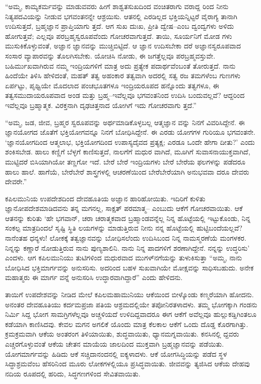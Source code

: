 “ಅಮ್ಮ, ಕಾಮ್ಯಕರ್ಮವನ್ನು ಮಾಡುವವರು ಹೀಗೆ ಶಾಶ್ವತಸುಖದಿಂದ ವಂಚಿತರಾಗು ವರಾದ್ದ ರಿಂದ ನೀನು ನಿತ್ಯಪದವಿಯನ್ನು ನೀಡುವ ಭಗವಂತನನ್ನೇ ಆಶ್ರಯಿಸು. ಆತನಲ್ಲಿ ಎರಡಿಲ್ಲದ ಭಕ್ತಿಯನ್ನಿಟ್ಟರೆ ವೈರಾಗ್ಯ ತಾನಾಗಿ ಉದಿಸುತ್ತದೆ, ಬ್ರಹ್ಮಜ್ಞಾನ ಪ್ರಾಪ್ತಿಯಾಗು ತ್ತದೆ. ಆಗ ಸುಖ ದುಃಖ, ಪ್ರೀತಿ ದ್ವೇಷ–ಎಂಬ ದ್ವಂದ್ವಗಳು ಅಳಿದು ಹೋಗುತ್ತವೆ; ಎಲ್ಲವೂ ಪರಬ್ರಹ್ಮಸ್ವರೂಪವೆಂದು ಗೋಚರವಾಗುತ್ತದೆ. ತಾಯಿ, ಸೂರ್ಯನಿಗೆ ಮೋಡ ಗಳು ಮುಸುಕಿಕೊಳ್ಳುವಂತೆ, ಅಜ್ಞಾನ ಜ್ಞಾನವನ್ನು ಮುಚ್ಚಿಬಿಟ್ಟಿದೆ. ಆ ಜ್ಞಾನ ಉದಿಸಬೇಕಾ ದರೆ ಅಜ್ಞಾನಸ್ವರೂಪವಾದ ಸಂಸಾರ ವ್ಯಾಪಾರವನ್ನು ತೊಲಗಿಸಬೇಕು. ಯೋಚಿಸಿ ನೋಡು, ಈ ಜಗತ್ತೆಲ್ಲವೂ ಪರಬ್ರಹ್ಮವಸ್ತುವೇ. ಬಹಿರ್ಮುಖವಾಗಿರುವ ನಮ್ಮ ಇಂದ್ರಿಯಗಳಿಗೆ ಮಾತ್ರ ಅದು ಪ್ರತ್ಯೇಕ ಪದಾರ್ಥವೆಂಬಂತೆ ತೋರುತ್ತದೆ. ನಾನು ಹಿಂದೆಯೇ ತಿಳಿಸಿ ಹೇಳಿದಂತೆ, ಮಹತ್ ತತ್ವ ಅಹಂಕಾರ ತತ್ವವಾಗಿ ಅದರಲ್ಲಿ ಸತ್ವ ರಜ ತಮಗಳೆಂಬ ಗುಣಗಳು ಏರ್ಪಟ್ಟು, ಪೃಥ್ವಿಯೇ ಮೊದಲಾದ ಪಂಚಭೂತಗಳೂ ಇಂದ್ರಿಯರೂಪದ ಹನ್ನೊಂದು ತತ್ವಗಳೂ, ಈ ತತ್ವಸಮುದಾಯರೂಪವಾದ ಅಂಡ ಮತ್ತು ಬ್ರಹ್ಮ–ಇವೆಲ್ಲವೂ ಭಗವಂತನಿಂದ ಉದಿಸಿ ಬಂದುವಲ್ಲವೆ? ಆದ್ದರಿಂದ ಇವೆಲ್ಲವೂ ಬ್ರಹ್ಮಾತ್ಮಕ. ವಿರಕ್ತನಾಗಿ ದೃಢಚಿತ್ತನಾದ ಯೋಗಿಗೆ ಇದು ಗೋಚರವಾಗು ತ್ತದೆ.”

“ಅಮ್ಮ, ಜಡ, ಜೀವ, ಬ್ರಹ್ಮರ ಸ್ವರೂಪವನ್ನು ಅರ್ಥಮಾಡಿಕೊಳ್ಳಬಲ್ಲ ಆತ್ಮಜ್ಞಾನ ವನ್ನು ನಿನಗೆ ವಿವರಿಸಿದ್ದೇನೆ. ಈ ಜ್ಞಾನಯೋಗದ ಜೊತೆಗೆ ಭಕ್ತಿಯೋಗವನ್ನೂ ನಿನಗೆ ಬೋಧಿಸಿದ್ದೇನೆ. ಈ ಎರಡು ಯೋಗಗಳ ಗುರಿಯೂ ಭಗವಂತನೇ. ‘ಜ್ಞಾನಯೋಗದಿಂದ ಆತ್ಮಲಾಭ, ಭಕ್ತಿಯೋಗದಿಂದ ಉಪಾಸ್ಯದೈವದ ಪ್ರತ್ಯಕ್ಷ; ಎರಡೂ ಒಂದೇ ಹೇಗಾ ದೀತು?’ ಎಂದು ಶಂಕಿಸಬೇಡ. ಹಾಲು ಕಣ್ಣಿಗೆ ಬೆಳ್ಳಗೆ ಕಾಣಿಸುತ್ತದೆ, ನಾಲಗೆಗೆ ಮಧುರ ವಾಗಿದೆ, ಮೂಗಿಗೆ ಸುವಾಸನಾಯುಕ್ತವಾಗಿದೆ, ಮುಟ್ಟಿದರೆ ಬಿಸಿಯಾಗಿಯೋ ತಣ್ಣಗೋ ಇದೆ. ಬೇರೆ ಬೇರೆ ಇಂದ್ರಿಯಗಳು ಬೇರೆ ಬೇರೆಯ ಫಲಗಳನ್ನು ಪಡೆದರೂ ಹಾಲು ಹಾಲೆ. ಹಾಗೆಯೆ, ಬೇರೆಬೇರೆ ಶಾಸ್ತ್ರಗಳಲ್ಲಿ ಆಚರಣೆಯಿಂದ ಬೇರೆಬೇರೆಯಾಗಿ ಅನುಭವವಾ ದರೂ ದೇವರು ದೇವರೇ.”

ಕಪಿಲಮುನಿಯ ಉಪದೇಶದಿಂದ ದೇವಹೂತಿಯ ಅಜ್ಞಾನ ಹಾರಿಹೋಯಿತು. ಇದಿರಿಗೆ ಕುಳಿತು ಜ್ಞಾನೋಪದೇಶಮಾಡಿದವನು ತನ್ನ ಮಗನಲ್ಲ, ಸಾಕ್ಷತ್ ಪರಮಾತ್ಮ– ಎಂಬುದು ಆಕೆಗೆ ಗೋಚರವಾಯಿತು. ಆಕೆ ಆತನನ್ನು ಕುರಿತು ‘ಹೇ ಭಗವಾನ್, ಚರಾ ಚರಾತ್ಮಕವಾದ ಬ್ರಹ್ಮಾಂಡವನ್ನೆಲ್ಲ ನಿನ್ನ ಹೊಟ್ಟೆಯಲ್ಲಿ ಇಟ್ಟುಕೊಂಡು, ನಿನ್ನ ಸಂಕಲ್ಪ ಮಾತ್ರದಿಂದಲೆ ಸೃಷ್ಟಿ ಸ್ಥಿತಿ ಲಯಗಳನ್ನು ಮಾಡುತ್ತಿರುವ ನೀನು ನನ್ನ ಹೊಟ್ಟೆಯಲ್ಲಿ ಹುಟ್ಟಿಬಂದೆಯಲ್ಲವೆ? ನಾನೆಂತಹ ಧನ್ಯಳು! ಲೋಕಕ್ಕೆ ತತ್ವಜ್ಞಾನವನ್ನು ಬೋಧಿಸಲೆಂದು ಉದಿಸಿಬಂದ ನಿನ್ನ ನಾಮಸ್ಮರಣೆಯೆ ಮಂಗಳಕರ. ನಿನ್ನನ್ನು ಕಣ್ಣಾರೆ ನೋಡುತ್ತಿರುವ ನಾನು ಪುಣ್ಯಶಾಲಿನಿ. ನಾನು ನಿನ್ನ ಪಾದಗಳಿಗೆ ಶರಣಾಗಿದ್ದೇನೆ. ನನ್ನನ್ನು ಉದ್ಧರಿಸು’ ಎಂದಳು. ಆಗ ಕಪಿಲಮುನಿಯು ತುಟಿಗಳಿಂದ ಮಧುರವಾದ ಮುಗಳ್​ನಗೆಯನ್ನು ತುಳುಕಿಸುತ್ತಾ “ಅಮ್ಮ, ನಾನು ಬೋಧಿಸಿದ ಭಕ್ತಿಮಾರ್ಗವನ್ನು ಅನುಸರಿಸು. ಅದರಿಂದ ಬಹಳ ಸುಖವಾಗಿಯೇ ಮೋಕ್ಷವನ್ನು ಸಾಧಿಸಬಹುದು. ಅನೇಕ ಮಹಾತ್ಮರು ಈ ಮಾರ್ಗ ವನ್ನೆ ಅನುಸರಿಸಿ ಉದ್ಧಾರವಾಗಿದ್ದಾರೆ” ಎಂದು ಹೇಳಿದನು.

ತಾಯಿಗೆ ಉಪದೇಶವನ್ನು ನೀಡಿದ ಮೇಲೆ ಕಪಿಲಮಹಾಮುನಿಯು ಆಕೆಯಿಂದ ಬೀಳ್ಕೊಂಡು ಕಣ್ಮರೆಯಾಗಿ ಹೋದನು. ಅನಂತರ ದೇವಹೂತಿಯು ಕರ್ದಮಪ್ರಜಾ ಪತಿಯ ಆಶ್ರಮದಲ್ಲಿಯೇ ತಪೋನಿರತಳಾದಳು. ತಮ್ಮ ಭೋಗಕ್ಕಾಗಿ ಗಂಡನು ನಿರ್ಮಿ ಸಿದ್ದ ಭೋಗ ಸಾಮಗ್ರಿಗಳೆಲ್ಲವೂ ಅಚ್ಚಳಿಯದೆ ಉಳಿದಿದ್ದವಾದರೂ ಈಗ ಆಕೆಗೆ ಅವೆಲ್ಲವೂ ಹುಲ್ಲುಕಡ್ಡಿಗಿಂತಲೂ ಕಡೆಯಾಗಿ ಕಾಣಿಸಿದವು. ಕೇವಲ ಮಗನ ಅಗಲಿಕೆ ಯೊಂದು ಮಾತ್ರ ಕೆಲಕಾಲ ಆಕೆಗೆ ಒಂದು ದೊಡ್ಡ ಕೊರಗಾಗಿತ್ತು. ಕ್ರಮಕ್ರಮವಾಗಿ ಆಕೆಯ ಅಂತರಂಗ ತಿಳಿಯಾಯಿತು, ಶುದ್ಧವಾಯಿತು, ಧ್ಯಾನಮಗ್ನವಾಯಿತು. ಕನಸಿನಲ್ಲಿ ದ್ದವರು ಎಚ್ಚರಗೊಳ್ಳುವಂತೆ ಆಕೆಯ ಚೇತನ ಮಾಯೆಯ ಜಾಲದಿಂದ ಮುಕ್ತವಾಗಿ ಬ್ರಹ್ಮಜ್ಞಾನವನ್ನು ಪಡೆಯಿತು. ಯೋಗಮಾರ್ಗವನ್ನು ಹಿಡಿದು ಆಕೆ ಸಚ್ಚಿದಾನಂದನಲ್ಲಿ ಐಕ್ಯಳಾದಳು. ಆಕೆ ಯೋಗಸಿದ್ಧಿಯನ್ನು ಪಡೆದ ಸ್ಥಳ ಸಿದ್ಧಾಶ್ರಮವೆಂಬ ಹೆಸರಿನಿಂದ ಮೂರು ಲೋಕಗಳಲ್ಲಿಯೂ ಪ್ರಸಿದ್ಧವಾಯಿತು. ಜೀವವನ್ನು ತ್ಯಜಿಸಿದ ಆಕೆಯ ದೇಹವು ನದಿಯ ರೂಪದಲ್ಲಿ ಹರಿದು, ಸಿದ್ಧಗಣಗಳಿಂದ ಸೇವಿತವಾಯಿತು.

